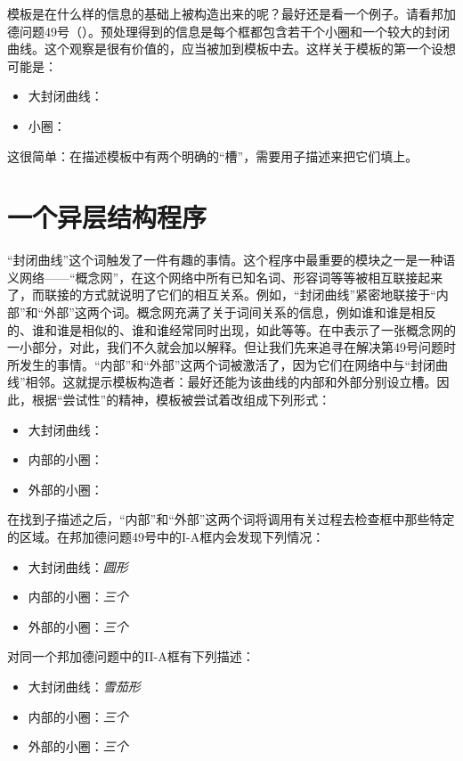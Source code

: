 模板是在什么样的信息的基础上被构造出来的呢？最好还是看一个例子。请看邦加德问题49号（）。预处理得到的信息是每个框都包含若干个小圈和一个较大的封闭曲线。这个观察是很有价值的，应当被加到模板中去。这样关于模板的第一个设想可能是：
\begin{itemize}
\item 大封闭曲线：\blankline
\item 小圈：\blankline
\end{itemize}

这很简单：在描述模板中有两个明确的“槽”，需要用子描述来把它们填上。

\section{一个异层结构程序}

“封闭曲线”这个词触发了一件有趣的事情。这个程序中最重要的模块之一是一种语义网络——“概念网”，在这个网络中所有已知名词、形容词等等被相互联接起来了，而联接的方式就说明了它们的相互关系。例如，“封闭曲线”紧密地联接于“内部”和“外部”这两个词。概念网充满了关于词间关系的信息，例如谁和谁是相反的、谁和谁是相似的、谁和谁经常同时出现，如此等等。在中表示了一张概念网的一小部分，对此，我们不久就会加以解释。但让我们先来追寻在解决第49号问题时所发生的事情。“内部”和“外部”这两个词被激活了，因为它们在网络中与“封闭曲线”相邻。这就提示模板构造者：最好还能为该曲线的内部和外部分别设立槽。因此，根据“尝试性”的精神，模板被尝试着改组成下列形式：
\begin{itemize}
\item 大封闭曲线：\blankline
\item 内部的小圈：\blankline
\item 外部的小圈：\blankline
\end{itemize}

在找到子描述之后，“内部”和“外部”这两个词将调用有关过程去检查框中那些特定的区域。在邦加德问题49号中的I-A框内会发现下列情况：
\begin{itemize}
\item 大封闭曲线：\textit{圆形}
\item 内部的小圈：\textit{三个}
\item 外部的小圈：\textit{三个}
\end{itemize}
对同一个邦加德问题中的II-A框有下列描述：
\begin{itemize}
\item 大封闭曲线：\textit{雪茄形}
\item 内部的小圈：\textit{三个}
\item 外部的小圈：\textit{三个}
\end{itemize}

